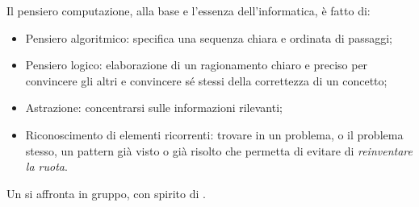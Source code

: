 \documentclass[../main]{subfiles}
\begin{document}
Il pensiero computazione, alla base e l’essenza dell’informatica, è fatto di:
\begin{itemize}
    \item Pensiero algoritmico: specifica una sequenza chiara e ordinata di passaggi;
    \item Pensiero logico: elaborazione di un ragionamento chiaro e preciso per convincere gli altri e convincere sé stessi della correttezza di un concetto;
    \item Astrazione: concentrarsi sulle informazioni rilevanti;
    \item Riconoscimento di elementi ricorrenti: trovare in un problema, o il problema stesso, un pattern già visto o già risolto che permetta di evitare di \textit{reinventare la ruota}.
\end{itemize}
Un  si affronta in gruppo, con spirito di .
\end{document}
